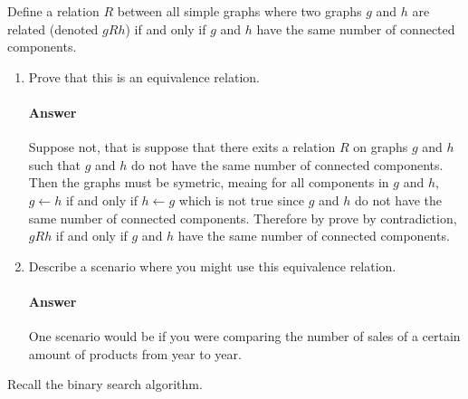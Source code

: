 \documentclass{article}
\begin{document}
 

Define a relation $R$ between all simple graphs where two graphs $g$ and $h$ are
related (denoted $gRh$) if and only if $g$ and $h$ have the same number of
connected components.

\begin{enumerate}

    \item Prove that this is an equivalence relation.

        \paragraph{Answer}

        Suppose not, that is suppose that there exits a relation $R$ on graphs $g$ and $h$ such that $g$ and $h$ do not have the same number of connected components. Then the graphs must be symetric, meaing for all components in $g$ and $h$, $g\leftarrow h$ if and only if $h \leftarrow g$ which is not true since $g$ and $h$ do not have the same number of connected components. Therefore by prove by contradiction, $gRh$ if and only if $g$ and $h$ have the same number of connected components. 

    \item Describe a scenario where you might use this equivalence relation.

        \paragraph{Answer}

        One scenario would be if you were comparing the number of sales of a certain amount of products from year to year.

\end{enumerate}
 

Recall the binary search algorithm.
\end{document}
